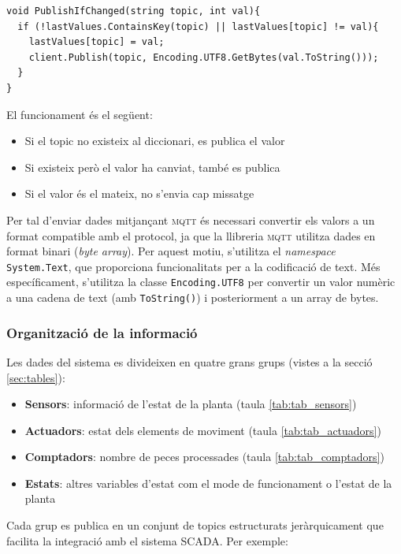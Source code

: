\documentclass[a4paper,11pt,DIV=13,headings=normal,abstract=true,twoside=semi]{article}
\newcommand{\acro}[1]{\textsc{#1}}
\begin{document}
\begin{lstlisting}[style=simple]
void PublishIfChanged(string topic, int val){
  if (!lastValues.ContainsKey(topic) || lastValues[topic] != val){
    lastValues[topic] = val;
    client.Publish(topic, Encoding.UTF8.GetBytes(val.ToString()));
  }
}
\end{lstlisting}

El funcionament és el següent:

\begin{itemize}
    \item Si el topic no existeix al diccionari, es publica el valor
    \item Si existeix però el valor ha canviat, també es publica
    \item Si el valor és el mateix, no s'envia cap missatge
\end{itemize}

Per tal d'enviar dades mitjançant \acro{mqtt}  és necessari convertir els valors a un format compatible amb el protocol, ja que la llibreria \acro{mqtt} utilitza dades en format binari (\emph{byte array}). Per aquest motiu, s'utilitza el \emph{namespace} \texttt{System.Text}, que proporciona funcionalitats per a la codificació de text. Més específicament, s'utilitza la classe \texttt{Encoding.UTF8} per convertir un valor numèric a una cadena de text (amb \texttt{ToString()}) i posteriorment a un array de bytes. 

\subsubsection*{Organització de la informació}

Les dades del sistema es divideixen en quatre grans grups (vistes a la secció \ref{sec:tables}):

\begin{itemize}
    \item \textbf{Sensors}: informació de l'estat de la planta (taula \ref{tab:tab_sensors})
    \item \textbf{Actuadors}: estat dels elements de moviment (taula \ref{tab:tab_actuadors})
    \item \textbf{Comptadors}: nombre de peces processades (taula \ref{tab:tab_comptadors})
    \item \textbf{Estats}: altres variables d'estat com el mode de funcionament o l'estat de la planta
\end{itemize}

Cada grup es publica en un conjunt de topics estructurats jeràrquicament que facilita la integració amb el sistema \acro{SCADA}. Per exemple:
\end{document}

